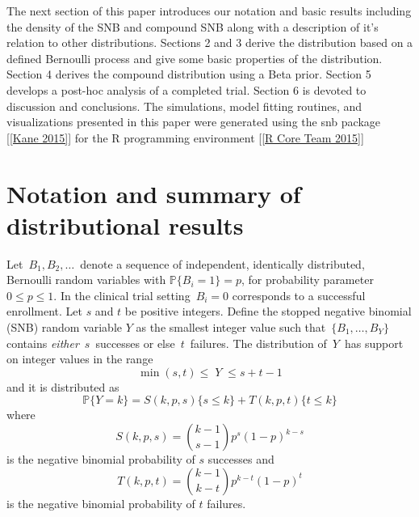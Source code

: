 \documentclass[12pt]{article}         %
\begin{document}
The next section of this paper introduces our notation and basic results including the density of the SNB and compound SNB along with a description of it's relation to other distributions. Sections 2 and 3 derive the distribution based on a defined Bernoulli process and give some basic properties of the distribution. Section 4 derives the compound distribution using a Beta prior. Section 5 develops a post-hoc analysis of a completed trial. Section 6 is devoted to discussion and conclusions. The simulations, model fitting routines, and visualizations presented in this paper were generated using the snb package [\ref{Kane 2015}] for the R programming environment [\ref{R Core Team 2015}]



\section   {Notation and summary of distributional results}
\label{notation.section}

Let $\,B_1, B_2, \ldots \,$ denote a sequence of independent, identically 
distributed, Bernoulli random variables with $\mathbb{P}\{B_i=1\}=p$, for 
probability parameter $0\leq p \leq 1$. In the clinical trial setting 
$\,B_i = 0$ corresponds to a successful enrollment. 
Let $s$ and $t$ be positive integers. 
Define the stopped negative binomial (SNB) random variable $Y$ as the smallest 
integer value such that $\,\{B_1, \ldots , B_Y\}\,$ contains {\em either} 
$\,s\,$ successes or else $\,t\,$ failures. The distribution of $\,Y\,$ has 
support on integer values in the range 
\begin{equation*}                                     %
     \min(s,t) \leq \; Y \;\leq s+t-1  \label{range.y.eq}
\end{equation*}
and it is distributed as
\begin{equation} \label{eqn:pmf}
\mathbb{P}\{Y=k\} = S(k, p, s)  \{s \leq k\} + T(k, p, t) \{t \leq k \} 
\end{equation}
where
\begin{equation} \label{eqn:N}
S(k, p, s) = {k-1 \choose s-1} p^s (1-p)^{k-s} 
\end{equation}
is the negative binomial probability of $s$ successes and
\begin{equation} \label{eqn:R}
T(k, p, t) = {k-1 \choose k-t} p^{k-t} (1-p)^t
\end{equation}
is the negative binomial probability of $t$ failures.
\end{document}
